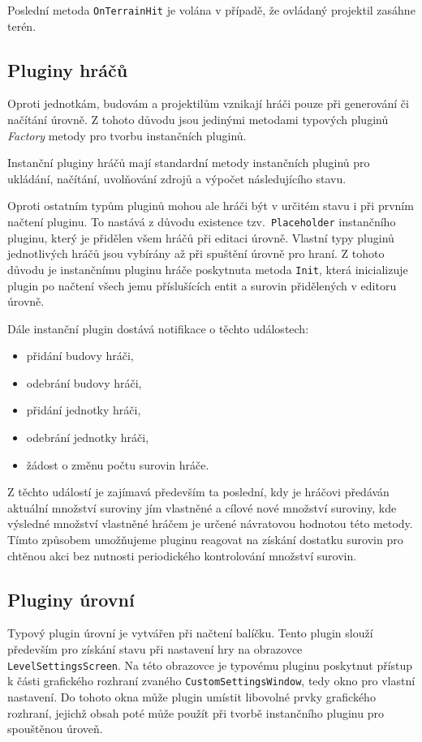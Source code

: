 Poslední metoda \texttt{OnTerrainHit} je volána v případě, že ovládaný projektil zasáhne terén.

\subsection{Pluginy hráčů}
Oproti jednotkám, budovám a projektilům vznikají hráči pouze při generování či načítání úrovně. Z tohoto důvodu jsou jedinými metodami typových pluginů \textit{Factory} metody pro tvorbu instančních pluginů.

Instanční pluginy hráčů mají standardní metody instančních pluginů pro ukládání, načítání, uvolňování zdrojů a výpočet následujícího stavu.

Oproti ostatním typům pluginů mohou ale hráči být v určitém stavu i při prvním načtení pluginu. To nastává z důvodu existence tzv.~\texttt{Placeholder} instančního pluginu, který je přidělen všem hráčů při editaci úrovně. Vlastní typy pluginů jednotlivých hráčů jsou vybírány až při spuštění úrovně pro hraní. Z tohoto důvodu je instančnímu pluginu hráče poskytnuta metoda \texttt{Init}, která inicializuje plugin po načtení všech jemu příslušících entit a surovin přidělených v editoru úrovně.

Dále instanční plugin dostává notifikace o těchto událostech:

\begin{itemize}
	\item přidání budovy hráči,
	\item odebrání budovy hráči,
	\item přidání jednotky hráči,
	\item odebrání jednotky hráči,
	\item žádost o změnu počtu surovin hráče.
\end{itemize}

Z těchto událostí je zajímavá především ta poslední, kdy je hráčovi předáván aktuální množství suroviny jím vlastněné a  cílové nové množství suroviny, kde výsledné množství vlastněné hráčem je určené návratovou hodnotou této metody. Tímto způsobem umožňujeme pluginu reagovat na získání dostatku surovin pro chtěnou akci bez nutnosti periodického kontrolování množství surovin.

\subsection{Pluginy úrovní}
Typový plugin úrovní je vytvářen při načtení balíčku. Tento plugin slouží především pro získání stavu při nastavení hry na obrazovce \texttt{LevelSettingsScreen}. Na této obrazovce je typovému pluginu poskytnut přístup k části grafického rozhraní zvaného \texttt{CustomSettingsWindow}, tedy okno pro vlastní nastavení. Do tohoto okna může plugin umístit libovolné prvky grafického rozhraní, jejichž obsah poté může použít při tvorbě instančního pluginu pro spouštěnou úroveň.

